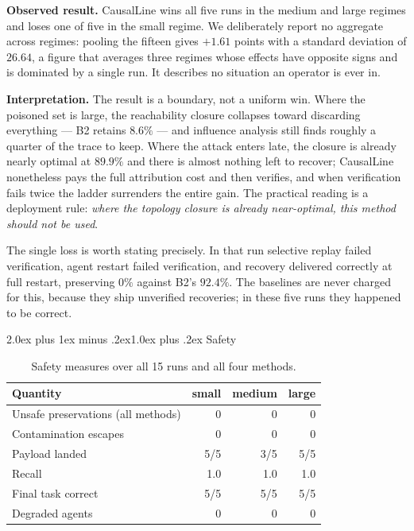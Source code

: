 \documentclass[10pt,twocolumn,a4paper]{article}
\makeatletter
\renewcommand{\subsection}{\@startsection{subsection}{2}{\z@}%
  {2.0ex plus 1ex minus .2ex}{1.0ex plus .2ex}%
  {\normalfont\normalsize\itshape}}
\newcommand{\sys}{CausalLine}
\newcommand{\btwo}{B2}
\makeatother
\begin{document}
\textbf{Observed result.} \sys{} wins all five runs in the medium and large
regimes and loses one of five in the small regime. We deliberately report no
aggregate across regimes: pooling the fifteen gives $+1.61$ points with a
standard deviation of $26.64$, a figure that averages three regimes whose
effects have opposite signs and is dominated by a single run. It describes no
situation an operator is ever in.

\textbf{Interpretation.} The result is a boundary, not a uniform win. Where the
poisoned set is large, the reachability closure collapses toward discarding
everything --- \btwo{} retains $8.6\%$ --- and influence analysis still finds
roughly a quarter of the trace to keep. Where the attack enters late, the
closure is already nearly optimal at $89.9\%$ and there is almost nothing left
to recover; \sys{} nonetheless pays the full attribution cost and then verifies,
and when verification fails twice the ladder surrenders the entire gain. The
practical reading is a deployment rule: \emph{where the topology closure is
already near-optimal, this method should not be used}.

The single loss is worth stating precisely. In that run selective replay failed
verification, agent restart failed verification, and recovery delivered
correctly at full restart, preserving $0\%$ against \btwo{}'s $92.4\%$. The
baselines are never charged for this, because they ship unverified recoveries;
in these five runs they happened to be correct.

\subsection{Safety}

\begin{table}[!tbp]
\centering
\caption{Safety measures over all 15 runs and all four methods.}
\label{tab:safety}
\footnotesize
\setlength{\tabcolsep}{4.5pt}
\begin{tabular}{lrrr}
\toprule
\textbf{Quantity} & \textbf{small} & \textbf{medium} & \textbf{large}\\
\midrule
Unsafe preservations (all methods) & 0 & 0 & 0\\
Contamination escapes              & 0 & 0 & 0\\
Payload landed                     & 5/5 & 3/5 & 5/5\\
Recall                             & 1.0 & 1.0 & 1.0\\
Final task correct                 & 5/5 & 5/5 & 5/5\\
Degraded agents                    & 0 & 0 & 0\\
\bottomrule
\end{tabular}
\end{table}
\end{document}
